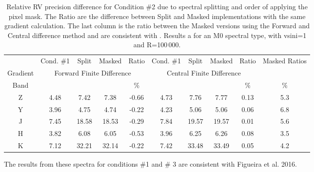 
\begin{table}
    \caption{Relative {RV} precision difference for Condition \#2 due to spectral splitting and order of applying the pixel mask. The Ratio are the difference between Split and Masked implementations with the same gradient calculation. The last column is the ratio between the Masked versions using the Forward and Central difference method and are consistent with . Results a for an M0 spectral type, with vsini=1 and R=100\,000.}
    \begin{tabular}{c|cccc|cccc|c}
        \toprule
        & Cond. \#1 & Split & Masked & Ratio &  Cond. \#1 & Split & Masked & Ratio & Masked Ratios\\
        Gradient &  \multicolumn{4}{c|}{Forward Finite Difference}  &  \multicolumn{4}{c|}{Central Finite Difference} & \\
        
        Band & \mps{} & \mps{} & \mps{} &  \%  & \mps{} & \mps{} & \mps{} &   \% & \% \\
        \midrule
   
        Z & 4.48 &  7.42 &  7.38 & -0.66 &  4.73 &  7.76 &  7.77 & 0.13 & 5.3\\
        Y & 3.96 &  4.75 &  4.74 & -0.22 &  4.23 &  5.06 &  5.06 & 0.06 & 6.8\\
        J & 7.45 & 18.58 & 18.53 & -0.29 &  7.84 & 19.57 & 19.57 & 0.01 & 5.6\\
        H & 3.82 &  6.08 &  6.05 & -0.53 &  3.96 &  6.25 &  6.26 & 0.08 & 3.5\\
        K & 7.12 & 32.21 & 32.14 & -0.22 &  7.42 & 33.48 & 33.49 & 0.05 & 4.2\\
        \bottomrule
    \end{tabular}
\end{table}

{\red{} The results from these spectra for conditions \#1 and \# 3 are consistent with Figueira et al. 2016. }